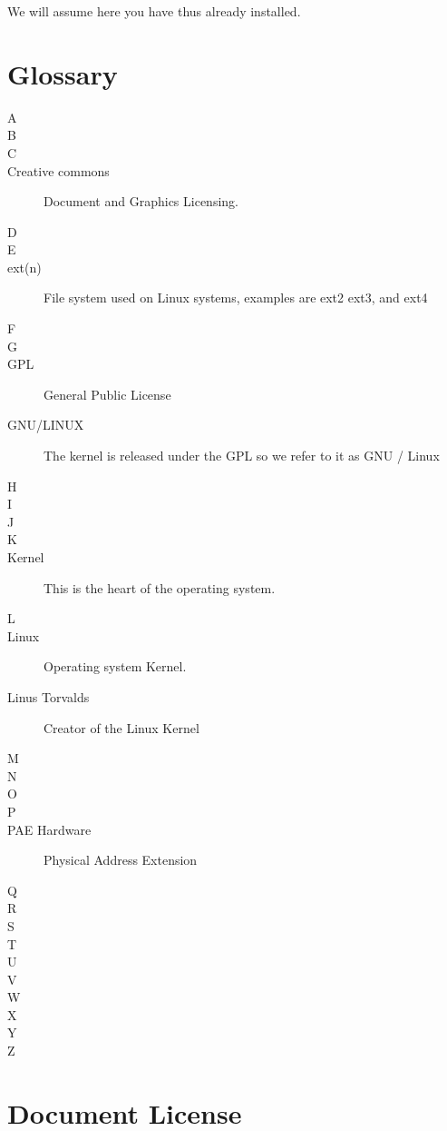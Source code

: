 \documentclass[12pt,a4paper]{book}
\begin{document}
We will assume here you have thus already installed.

\chapter{Glossary}
\begin{multicols}{2}
 

\begin{description}
\item[A]
\item[B]
\item[C]
\item[Creative commons] Document and Graphics Licensing.
\item[D]
\item[E]
\item[ext(n)] File system used on Linux systems, examples are ext2 ext3, and ext4 
\item[F]
\item[G]
\item[GPL] General Public License 
\item[GNU/LINUX] The kernel is released under the GPL so we refer to it as GNU / Linux
\item[H]
\item[I]
\item[J]
\item[K]
\item[Kernel] This is the heart of the operating system.
\columnbreak
\item[L]
\item[Linux] Operating system Kernel. 
\item[Linus Torvalds] Creator of the Linux Kernel
\item[M]
\item[N]
\item[O]
\item[P]
\item[PAE Hardware] Physical Address Extension 
\item[Q]
\item[R]
\item[S]
\item[T]
\item[U]
\item[V]
\item[W]
\item[X]
\item[Y]
\item[Z]
\end{description}
\end{multicols}
\chapter{Document License}

\end{document}
